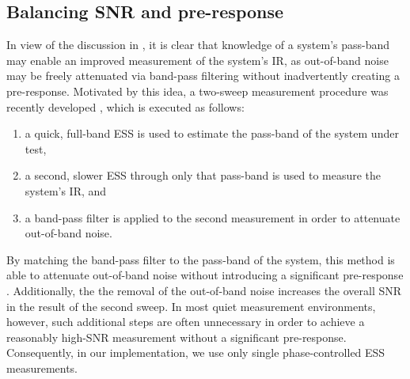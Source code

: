 \subsection{Balancing SNR and pre-response}\label{sec:A5_Impulse_Response:Two-Step-ESS}
In view of the discussion in , it is clear that knowledge of a system's pass-band may enable an improved measurement of the system's IR, as out-of-band noise may be freely attenuated via band-pass filtering without inadvertently creating a pre-response.
Motivated by this idea, a two-sweep measurement procedure was recently developed \citep{Tylka2014,Choueiri2018}, which is executed as follows:
\begin{enumerate}
\item a quick, full-band ESS is used to estimate the pass-band of the system under test,
\item a second, slower ESS through only that pass-band is used to measure the system's IR, and
\item a band-pass filter is applied to the second measurement in order to attenuate out-of-band noise.
\end{enumerate}
By matching the band-pass filter to the pass-band of the system, this method is able to attenuate out-of-band noise without introducing a significant pre-response \citep{Tylka2014}.
Additionally, the the removal of the out-of-band noise increases the overall SNR in the result of the second sweep.
In most quiet measurement environments, however, such additional steps are often unnecessary in order to achieve a reasonably high-SNR measurement without a significant pre-response.
Consequently, in our implementation, we use only single phase-controlled ESS measurements.


